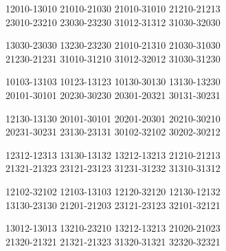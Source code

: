 \begingroup\footnotesize\ttfamily\begin{flushleft}
12010-13010 21010-21030 21010-31010 21210-21213\\
23010-23210 23030-23230 31012-31312 31030-32030\\
\end{flushleft}\endgroup
\begingroup\footnotesize\ttfamily\begin{flushleft}
13030-23030 13230-23230 21010-21310 21030-31030\\
21230-21231 31010-31210 31012-32012 31030-31230\\
\end{flushleft}\endgroup
\begingroup\footnotesize\ttfamily\begin{flushleft}
10103-13103 10123-13123 10130-30130 13130-13230\\
20101-30101 20230-30230 20301-20321 30131-30231\\
\end{flushleft}\endgroup
\begingroup\footnotesize\ttfamily\begin{flushleft}
12130-13130 20101-30101 20201-20301 20210-30210\\
20231-30231 23130-23131 30102-32102 30202-30212\\
\end{flushleft}\endgroup
\begingroup\footnotesize\ttfamily\begin{flushleft}
12312-12313 13130-13132 13212-13213 21210-21213\\
21321-21323 23121-23123 31231-31232 31310-31312\\
\end{flushleft}\endgroup
\begingroup\footnotesize\ttfamily\begin{flushleft}
12102-32102 12103-13103 12120-32120 12130-12132\\
13130-23130 21201-21203 23121-23123 32101-32121\\
\end{flushleft}\endgroup
\begingroup\footnotesize\ttfamily\begin{flushleft}
13012-13013 13210-23210 13212-13213 21020-21023\\
21320-21321 21321-21323 31320-31321 32320-32321\\
\end{flushleft}\endgroup
